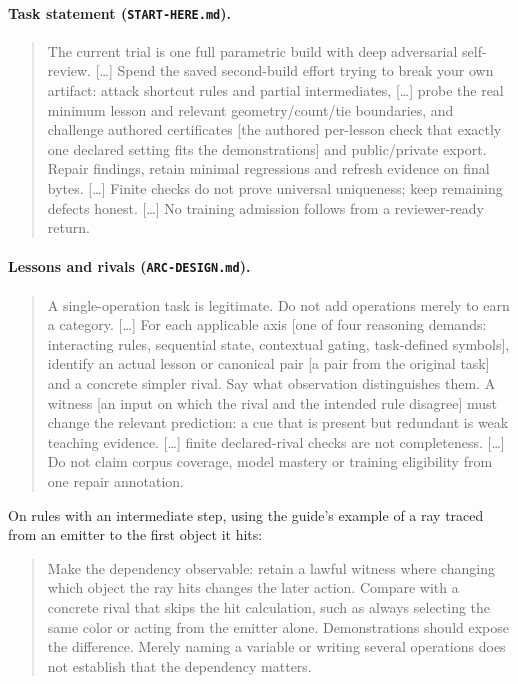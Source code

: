 \documentclass[11pt]{article}
\begin{document}
\paragraph{Task statement (\texttt{START-HERE.md}).}
\begin{quote}\small
The current trial is one full parametric build with deep adversarial
self-review. [\dots] Spend the saved second-build effort trying to break your
own artifact: attack shortcut rules and partial intermediates, [\dots] probe
the real minimum lesson and relevant geometry/count/tie boundaries, and
challenge authored certificates [the authored per-lesson check that exactly
one declared setting fits the demonstrations] and public/private export. Repair findings, retain minimal regressions
and refresh evidence on final bytes. [\dots] Finite checks do not prove
universal uniqueness; keep remaining defects honest. [\dots] No training
admission follows from a reviewer-ready return.
\end{quote}

\paragraph{Lessons and rivals (\texttt{ARC-DESIGN.md}).}
\begin{quote}\small
A single-operation task is legitimate. Do not add operations merely to earn a
category. [\dots] For each applicable axis [one of four reasoning demands:
interacting rules, sequential state, contextual gating, task-defined symbols],
identify an actual lesson or
canonical pair [a pair from the original task] and a concrete simpler rival.
Say what observation distinguishes them. A witness [an input on which the
rival and the intended rule disagree] must change the relevant prediction: a
cue that is present but redundant is weak teaching evidence. [\dots]
finite declared-rival checks are not completeness. [\dots] Do not claim corpus
coverage, model mastery or training eligibility from one repair annotation.
\end{quote}
\noindent On rules with an intermediate step, using the guide's example of a
ray traced from an emitter to the first object it hits:
\begin{quote}\small
Make the dependency observable: retain a lawful witness where changing which
object the ray hits changes the later action. Compare with a concrete rival
that skips the hit calculation, such as always selecting the same color or
acting from the emitter alone. Demonstrations should expose the difference.
Merely naming a variable or writing several operations does not establish that
the dependency matters.
\end{quote}
\end{document}
